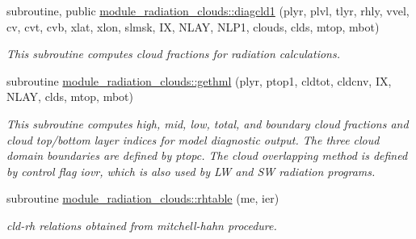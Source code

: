 \textbf{ }\par
\begin{DoxyCompactItemize}
\item 
subroutine, public \hyperlink{group__module__radiation__clouds_ga022c3706242426745001b7837ae801a3}{module\+\_\+radiation\+\_\+clouds\+::diagcld1} (plyr, plvl, tlyr, rhly, vvel, cv, cvt, cvb, xlat, xlon, slmsk, IX, N\+L\+AY, N\+L\+P1, clouds, clds, mtop, mbot)
\begin{DoxyCompactList}\small\item\em This subroutine computes cloud fractions for radiation calculations. \end{DoxyCompactList}\end{DoxyCompactItemize}

\textbf{ }\par
\begin{DoxyCompactItemize}
\item 
subroutine \hyperlink{group__module__radiation__clouds_gac231d967afcfb252dedba82e9085b34d}{module\+\_\+radiation\+\_\+clouds\+::gethml} (plyr, ptop1, cldtot, cldcnv, IX, N\+L\+AY, clds, mtop, mbot)
\begin{DoxyCompactList}\small\item\em This subroutine computes high, mid, low, total, and boundary cloud fractions and cloud top/bottom layer indices for model diagnostic output. The three cloud domain boundaries are defined by ptopc. The cloud overlapping method is defined by control flag \textquotesingle{}iovr\textquotesingle{}, which is also used by LW and SW radiation programs. \end{DoxyCompactList}\item 
subroutine \hyperlink{group__module__radiation__clouds_ga9b3f43844a53e79cd5c348f8c72ec408}{module\+\_\+radiation\+\_\+clouds\+::rhtable} (me, ier)
\begin{DoxyCompactList}\small\item\em cld-\/rh relations obtained from mitchell-\/hahn procedure. \end{DoxyCompactList}\end{DoxyCompactItemize}

